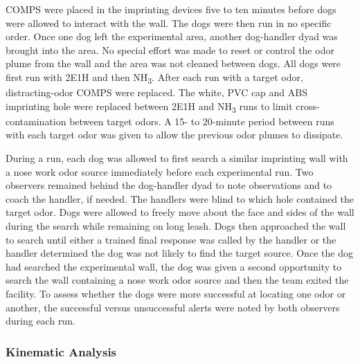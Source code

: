 \documentclass[
]{article}
\begin{document}
COMPS were placed in the imprinting devices five to ten minutes before dogs were allowed to interact with the wall. The dogs were then run in no specific order. Once one dog left the experimental area, another dog-handler dyad was brought into the area. No special effort was made to reset or control the odor plume from the wall and the area was not cleaned between dogs. All dogs were first run with 2E1H and then NH\textsubscript{3}. After each run with a target odor, distracting-odor COMPS were replaced. The white, PVC cap and ABS imprinting hole were replaced between 2E1H and NH\textsubscript{3} runs to limit cross-contamination between target odors. A 15- to 20-minute period between runs with each target odor was given to allow the previous odor plumes to dissipate.

During a run, each dog was allowed to first search a similar imprinting wall with a nose work odor source immediately before each experimental run. Two observers remained behind the dog-handler dyad to note observations and to coach the handler, if needed. The handlers were blind to which hole contained the target odor. Dogs were allowed to freely move about the face and sides of the wall during the search while remaining on long leash. Dogs then approached the wall to search until either a trained final response was called by the handler or the handler determined the dog was not likely to find the target source. Once the dog had searched the experimental wall, the dog was given a second opportunity to search the wall containing a nose work odor source and then the team exited the facility. To assess whether the dogs were more successful at locating one odor or another, the successful versus unsuccessful alerts were noted by both observers during each run.

\hypertarget{kinematic-analysis}{%
\subsubsection{Kinematic Analysis}\label{kinematic-analysis}}
\end{document}
